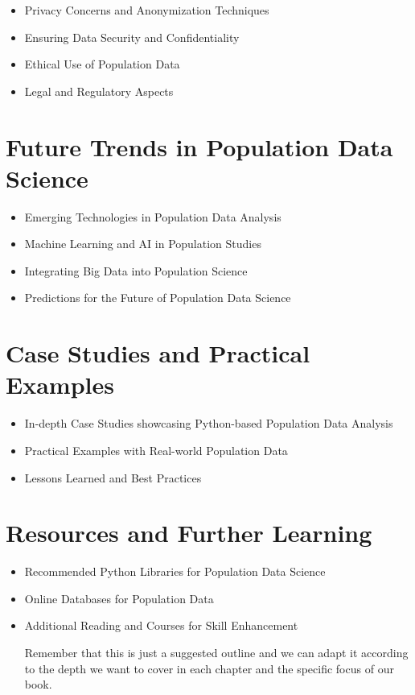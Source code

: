\documentclass[
]{book}
\providecommand{\tightlist}{%
  \setlength{\itemsep}{0pt}\setlength{\parskip}{0pt}}\usepackage{longtable,booktabs,array}
\begin{document}
\begin{itemize}
\tightlist
\item
  Privacy Concerns and Anonymization Techniques
\item
  Ensuring Data Security and Confidentiality
\item
  Ethical Use of Population Data
\item
  Legal and Regulatory Aspects
\end{itemize}

\hypertarget{future-trends-in-population-data-science}{%
\chapter{\texorpdfstring{\textbf{Future Trends in Population Data
Science}}{Future Trends in Population Data Science}}\label{future-trends-in-population-data-science}}

\begin{itemize}
\tightlist
\item
  Emerging Technologies in Population Data Analysis
\item
  Machine Learning and AI in Population Studies
\item
  Integrating Big Data into Population Science
\item
  Predictions for the Future of Population Data Science
\end{itemize}

\hypertarget{case-studies-and-practical-examples}{%
\chapter{\texorpdfstring{\textbf{Case Studies and Practical
Examples}}{Case Studies and Practical Examples}}\label{case-studies-and-practical-examples}}

\begin{itemize}
\tightlist
\item
  In-depth Case Studies showcasing Python-based Population Data Analysis
\item
  Practical Examples with Real-world Population Data
\item
  Lessons Learned and Best Practices
\end{itemize}

\hypertarget{resources-and-further-learning}{%
\chapter{\texorpdfstring{\textbf{Resources and Further
Learning}}{Resources and Further Learning}}\label{resources-and-further-learning}}

\begin{itemize}
\item
  Recommended Python Libraries for Population Data Science
\item
  Online Databases for Population Data
\item
  Additional Reading and Courses for Skill Enhancement

  Remember that this is just a suggested outline and we can adapt it
  according to the depth we want to cover in each chapter and the
  specific focus of our book.
\end{itemize}


\backmatter
\end{document}
